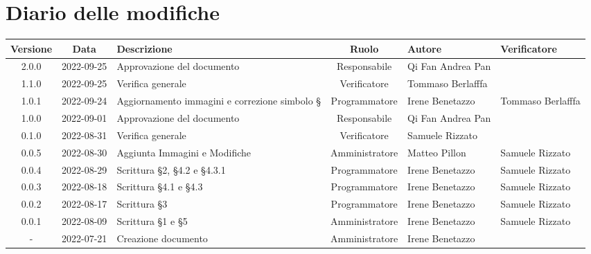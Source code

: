 \section*{Diario delle modifiche}
	\begin{center}
	\renewcommand{\arraystretch}{1.8} %
	\begin{longtable}{ |c|c|p{8em}|c|m{5em}|m{6em}| }
	\hline
	\textbf{Versione} & \textbf{Data} & \textbf{Descrizione} &  \textbf{Ruolo} &  \textbf{Autore} & \textbf{Verificatore}\\ %
	\hline %
	2.0.0 & 2022-09-25 &  Approvazione del documento & Responsabile & Qi Fan Andrea \newline Pan& \\ 
	\hline
	1.1.0 & 2022-09-25 & Verifica generale & Verificatore & Tommaso \newline Berlafffa & \\ 
	\hline
  1.0.1 & 2022-09-24 & Aggiornamento immagini e correzione simbolo § & Programmatore & Irene \newline Benetazzo & Tommaso \newline Berlafffa \\ 
	\hline
	1.0.0& 2022-09-01 & Approvazione del documento & Responsabile & Qi Fan Andrea \newline Pan & \\ 	
	\hline
	0.1.0& 2022-08-31 & Verifica generale & Verificatore & Samuele \newline Rizzato & \\ 
	\hline
	0.0.5& 2022-08-30 & Aggiunta Immagini e Modifiche & Amministratore & Matteo \newline Pillon & Samuele \newline Rizzato\\ 
	\hline
	0.0.4& 2022-08-29 & Scrittura §2, §4.2 e §4.3.1 & Programmatore & Irene \newline Benetazzo & Samuele \newline Rizzato\\ 
	\hline
	0.0.3& 2022-08-18 & Scrittura §4.1 e §4.3 & Programmatore & Irene \newline Benetazzo & Samuele \newline Rizzato\\ 
	\hline
	0.0.2& 2022-08-17 & Scrittura §3 & Programmatore & Irene \newline Benetazzo & Samuele \newline Rizzato\\ 
	\hline
	0.0.1& 2022-08-09 & Scrittura §1 e §5 & Amministratore & Irene \newline Benetazzo & Samuele \newline Rizzato\\ 
	\hline
    -& 2022-07-21 & Creazione documento & Amministratore & Irene \newline Benetazzo & \\ 
	\hline
	\end{longtable}
	\end{center}
	\newpage